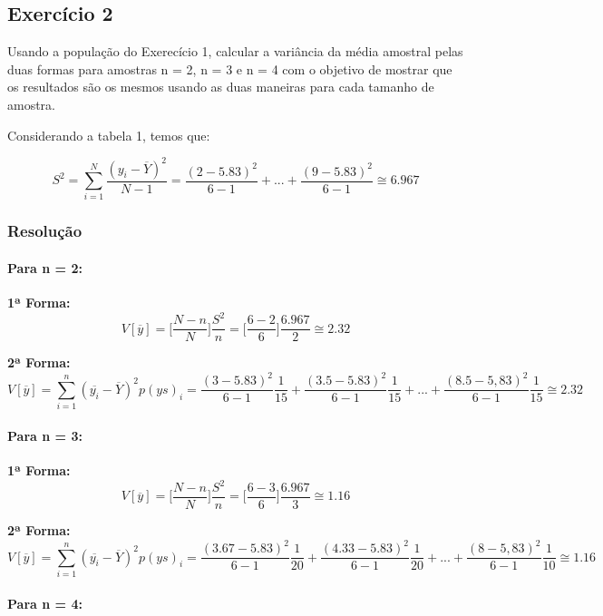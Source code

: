 \documentclass[]{article}
\let\oldparagraph\paragraph
\renewcommand{\paragraph}[1]{\oldparagraph{#1}\mbox{}}
\begin{document}
\subsection{Exercício 2}\label{exercicio-2}

Usando a população do Exerecício 1, calcular a variância da média
amostral pelas duas formas para amostras n = 2, n = 3 e n = 4 com o
objetivo de mostrar que os resultados são os mesmos usando as duas
maneiras para cada tamanho de amostra.

Considerando a tabela 1, temos que:

\[
S^2=\sum_{i=1}^N\dfrac{(y_i-\overline{Y})^2}{N-1}=\dfrac{(2-5.83)^2}{6-1}+...+\dfrac{(9-5.83)^2}{6-1}\cong6.967
\]

\subsubsection{Resolução}\label{resolucao-1}

\paragraph{Para n = 2:}\label{para-n-2}

\textbf{1ª Forma:} \[
V[\overline{y}]=\bigg[\dfrac{N-n}{N}\bigg] \dfrac{S^2}{n}=\bigg[\dfrac{6-2}{6}\bigg]\dfrac{6.967}{2}\cong2.32
\]

\textbf{2ª Forma:} \[
V[\overline{y}]=\sum_{i=1}^n(\overline{y_i}-\overline{Y})^2p(ys)_i=\dfrac{(3-5.83)^2}{6-1}\dfrac{1}{15}+\dfrac{(3.5-5.83)^2}{6-1}\dfrac{1}{15}+...+\dfrac{(8.5-5,83)^2}{6-1}\dfrac{1}{15}\cong2.32
\]

\paragraph{Para n = 3:}\label{para-n-3}

\textbf{1ª Forma:} \[
V[\overline{y}]=\bigg[\dfrac{N-n}{N}\bigg] \dfrac{S^2}{n}=\bigg[\dfrac{6-3}{6}\bigg]\dfrac{6.967}{3}\cong1.16
\]

\textbf{2ª Forma:} \[
V[\overline{y}]=\sum_{i=1}^n(\overline{y_i}-\overline{Y})^2p(ys)_i=\dfrac{(3.67-5.83)^2}{6-1}\dfrac{1}{20}+\dfrac{(4.33-5.83)^2}{6-1}\dfrac{1}{20}+...+\dfrac{(8-5,83)^2}{6-1}\dfrac{1}{10}\cong1.16
\]

\paragraph{Para n = 4:}\label{para-n-4}
\end{document}
